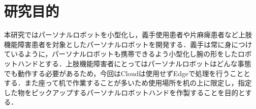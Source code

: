 \section{研究目的}

本研究ではパーソナルロボットを小型化し，義手使用患者や片麻痺患者など上肢機能障害患者を対象としたパーソナルロボットを開発する．義手は常に身につけているように，パーソナルロボットも携帯できるよう小型化し腕の形をしたロボットハンドとする．上肢機能障害者にとってはパーソナルロボットはどんな事態でも動作する必要があるため，今回はCloudは使用せずEdgeで処理を行うこととする．また座って机で作業することが多いため使用場所を机の上に限定し，指定した物をピックアップするパーソナルロボットハンドを作製することを目的とする．
